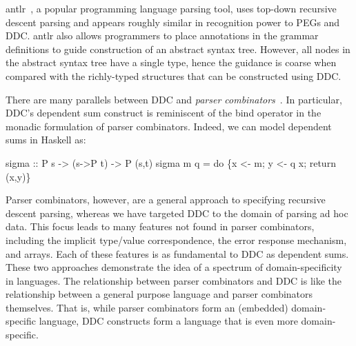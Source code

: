 {\sc antlr}~\cite{antlr}, a popular programming language parsing tool, 
uses top-down recursive descent
parsing and appears roughly similar in recognition power to PEGs and DDC.
{\sc antlr} also allows programmers to place annotations
in the grammar definitions to guide construction of an abstract syntax
tree. However, all nodes in the abstract syntax tree have a 
single type, hence the guidance is coarse when compared with
the richly-typed structures that can be constructed using
DDC.




There are many parallels between DDC{} and {\it parser
combinators}~\cite{burge:parser-combinators,hutton+:parser-combinators}. 
In particular, DDC{}'s dependent sum construct is 
reminiscent of the bind operator in the monadic formulation of parser
combinators.  Indeed, we can model dependent sums in Haskell as:
\begin{code}
\mbox{}
sigma :: P s -> (s->P t) -> P (s,t)
sigma m q = do \{x <- m; y <- q x; return (x,y)\}
\mbox{}
\end{code}%
\noindent
Parser combinators, however, are a general approach to specifying
recursive descent parsing, whereas we have targeted DDC{}
to the domain of parsing ad hoc data. This focus leads to 
many features not found in parser combinators, including the implicit
type/value correspondence, the error response mechanism, and 
arrays. Each of these features is as fundamental to DDC{} as 
dependent sums. These two approaches
demonstrate the idea of a spectrum of domain-specificity in
languages. The relationship between parser combinators and DDC{} is
like the relationship between a general purpose language and parser
combinators themselves. That is, while parser combinators form an
(embedded) domain-specific language, DDC{} constructs form a language 
that is even more domain-specific. 


